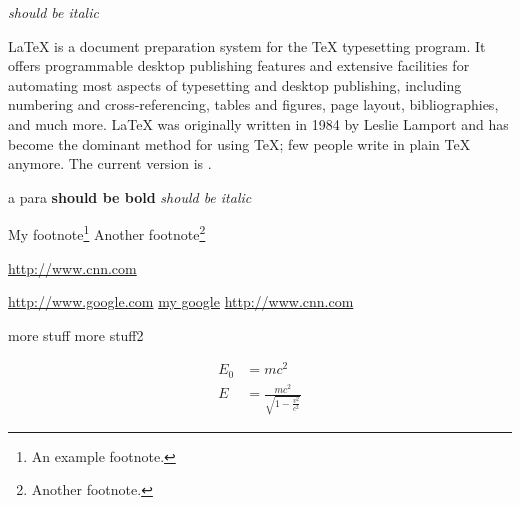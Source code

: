 \documentclass[10pt,a4paper]{article}
\begin{document}
  \textit{should be italic}


\LaTeX{} is a document preparation system for the \TeX{}
  typesetting program. It offers programmable desktop
  publishing features and extensive facilities for
  automating most aspects of typesetting and desktop
  publishing, including numbering and cross-referencing,
  tables and figures, page layout, bibliographies, and
  much more. \LaTeX{} was originally written in 1984 by
  Leslie Lamport and has become the dominant method for
  using \TeX; few people write in plain \TeX{} anymore.
  The current version is \LaTeXe.

  \begin{flushright}
  a para
  \textbf{should be bold}
  \textit{should be italic}

  \end{flushright}



  \begin{flushleft}
  My footnote\footnote{An example footnote.}
  Another footnote\footnote{Another footnote.}

  \hyperref[cnn]{http://www.cnn.com}

  \url{http://www.google.com}
  \href{http://www.google.com}{my google}
  \href{http://www.cnn.com}{http://www.cnn.com}

  \end{flushleft}
  more stuff
  more stuff2

  \begin{align}
    E_0 &= mc^2                              \\
    E &= \frac{mc^2}{\sqrt{1-\frac{v^2}{c^2}}}
  \end{align}
\end{document}

